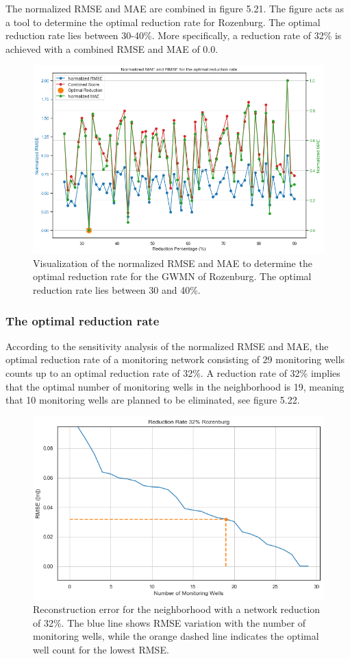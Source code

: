 The normalized RMSE and MAE are combined in figure 5.21. The figure acts as a tool to determine the optimal reduction rate for Rozenburg. The optimal reduction rate lies between 30-40\%. More specifically, a reduction rate of 32\% is achieved with a combined RMSE and MAE of 0.0.

\begin{figure}[htbp]
    \centering
    \includegraphics[width=0.80\linewidth]{normroz.png}
    \caption{Visualization of the normalized RMSE and MAE to determine the optimal reduction rate for the GWMN of Rozenburg. The optimal reduction rate lies between 30 and 40\%.}
\end{figure}


\subsubsection{The optimal reduction rate}
According to the sensitivity analysis of the normalized RMSE and MAE, the optimal reduction rate of a monitoring network consisting of 29 monitoring wells counts up to an optimal reduction rate of 32\%. A reduction rate of 32\% implies that the optimal number of monitoring wells in the neighborhood is 19, meaning that 10 monitoring wells are planned to be eliminated, see figure 5.22.

\begin{figure}
    \centering
    \includegraphics[width=0.8\linewidth]{RRroz32.png}
    \caption{Reconstruction error for the neighborhood with a network reduction of 32\%. The blue line shows RMSE variation with the number of monitoring wells, while the orange dashed line indicates the optimal well count for the lowest RMSE.}
\end{figure}

